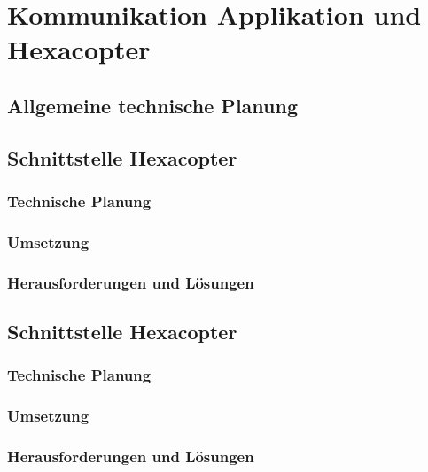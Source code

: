 \chapter{Kommunikation Applikation und Hexacopter}
\renewcommand{\kapitelautor}{Autor: Katharina Joksch, Lucas Ullrich}

\section{Allgemeine technische Planung}

\section{Schnittstelle Hexacopter}
\renewcommand{\kapitelautor}{Autor: Lucas Ullrich}

  \subsection{Technische Planung}

  \subsection{Umsetzung}

  \subsection{Herausforderungen und Lösungen}

\section{Schnittstelle Hexacopter}
\renewcommand{\kapitelautor}{Autor: Katharina Joksch}

  \subsection{Technische Planung}

  \subsection{Umsetzung}
  
  \subsection{Herausforderungen und Lösungen}


